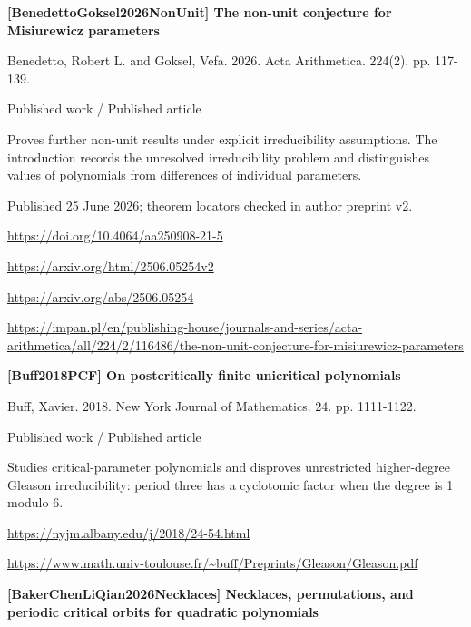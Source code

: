 \documentclass[11pt,a4paper,oneside,openany]{book}
\begin{document}
{\sffamily\bfseries\color{atlasgreen}[BenedettoGoksel2026NonUnit] The non-unit conjecture for Misiurewicz parameters}\par
\color{black} Benedetto, Robert L. and Goksel, Vefa. 2026. Acta Arithmetica. 224(2). pp. 117-139.\par
{\small\sffamily\color{atlasgold}Published work / Published article}\par
\color{black} Proves further non-unit results under explicit irreducibility assumptions. The introduction records the unresolved irreducibility problem and distinguishes values of polynomials from differences of individual parameters.\par
{\small Published 25 June 2026; theorem locators checked in author preprint v2.}\par
{\footnotesize\url{https://doi.org/10.4064/aa250908-21-5}}\par
{\footnotesize\url{https://arxiv.org/html/2506.05254v2}}\par
{\footnotesize\url{https://arxiv.org/abs/2506.05254}}\par
{\footnotesize\url{https://impan.pl/en/publishing-house/journals-and-series/acta-arithmetica/all/224/2/116486/the-non-unit-conjecture-for-misiurewicz-parameters}}\par
\vspace{9pt}
\hypertarget{ref:Buff2018PCF}{}
{\sffamily\bfseries\color{atlasgreen}[Buff2018PCF] On postcritically finite unicritical polynomials}\par
\color{black} Buff, Xavier. 2018. New York Journal of Mathematics. 24. pp. 1111-1122.\par
{\small\sffamily\color{atlasgold}Published work / Published article}\par
\color{black} Studies critical-parameter polynomials and disproves unrestricted higher-degree Gleason irreducibility: period three has a cyclotomic factor when the degree is 1 modulo 6.\par
{\footnotesize\url{https://nyjm.albany.edu/j/2018/24-54.html}}\par
{\footnotesize\url{https://www.math.univ-toulouse.fr/~buff/Preprints/Gleason/Gleason.pdf}}\par
\vspace{9pt}
\hypertarget{ref:BakerChenLiQian2026Necklaces}{}
{\sffamily\bfseries\color{atlasgreen}[BakerChenLiQian2026Necklaces] Necklaces, permutations, and periodic critical orbits for quadratic polynomials}\par
\end{document}
